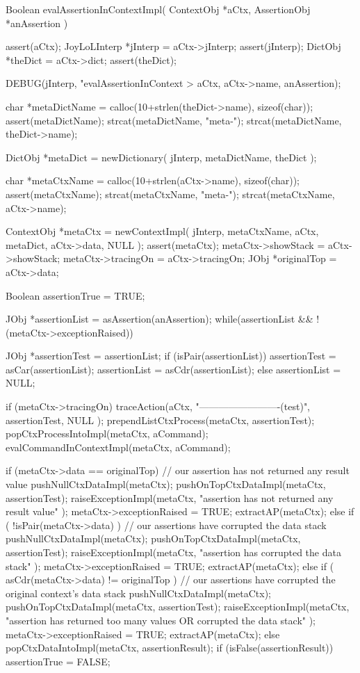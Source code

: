 \startCCode
Boolean evalAssertionInContextImpl(
  ContextObj   *aCtx,
  AssertionObj *anAssertion
) {
  assert(aCtx);
  JoyLoLInterp *jInterp = aCtx->jInterp;
  assert(jInterp);
  DictObj *theDict = aCtx->dict;
  assert(theDict);
  
  DEBUG(jInterp, "evalAssertionInContext > %
    aCtx, aCtx->name, anAssertion);

  char *metaDictName = calloc(10+strlen(theDict->name), sizeof(char));
  assert(metaDictName);
  strcat(metaDictName, "meta-");
  strcat(metaDictName, theDict->name);
  
  DictObj *metaDict = newDictionary(
    jInterp,
    metaDictName,
    theDict
  );
  
  char *metaCtxName = calloc(10+strlen(aCtx->name), sizeof(char));
  assert(metaCtxName);
  strcat(metaCtxName, "meta-");
  strcat(metaCtxName, aCtx->name);
  
  ContextObj *metaCtx = newContextImpl(
    jInterp,
    metaCtxName,
    aCtx,
    metaDict,
    aCtx->data,
    NULL
  );
  assert(metaCtx);
  metaCtx->showStack = aCtx->showStack;
  metaCtx->tracingOn = aCtx->tracingOn;
  JObj *originalTop  = aCtx->data;
  
  Boolean assertionTrue = TRUE;

  JObj *assertionList = asAssertion(anAssertion);
  while(assertionList && !(metaCtx->exceptionRaised)) {
    JObj *assertionTest = assertionList;
    if (isPair(assertionList)) {
      assertionTest = asCar(assertionList);
      assertionList = asCdr(assertionList);
    } else {
      assertionList = NULL;
    }

    if (metaCtx->tracingOn)
      traceAction(aCtx,
        "\n-------------------------\nevalAssertion(test)",
        assertionTest, NULL
      );
    prependListCtxProcess(metaCtx, assertionTest);
    popCtxProcessIntoImpl(metaCtx, aCommand);
    evalCommandInContextImpl(metaCtx, aCommand);
    
    if (metaCtx->data == originalTop) {
      // our assertion has not returned any result value
      pushNullCtxDataImpl(metaCtx);
      pushOnTopCtxDataImpl(metaCtx, assertionTest);
      raiseExceptionImpl(metaCtx,
        "assertion has not returned any result value"
        );
      metaCtx->exceptionRaised = TRUE;
      extractAP(metaCtx);
    } else if ( !isPair(metaCtx->data) ) {
      // our assertions have corrupted the data stack
      pushNullCtxDataImpl(metaCtx);
      pushOnTopCtxDataImpl(metaCtx, assertionTest);
      raiseExceptionImpl(metaCtx,
        "assertion has corrupted the data stack"
        );      
      metaCtx->exceptionRaised = TRUE;
      extractAP(metaCtx);
    } else if ( asCdr(metaCtx->data) != originalTop ) {
      // our assertions have corrupted the original context's data stack
      pushNullCtxDataImpl(metaCtx);
      pushOnTopCtxDataImpl(metaCtx, assertionTest);
      raiseExceptionImpl(metaCtx,
        "assertion has returned too many values OR corrupted the data stack"
        );
      metaCtx->exceptionRaised = TRUE;
      extractAP(metaCtx);
    } else {
      popCtxDataIntoImpl(metaCtx, assertionResult);
      if (isFalse(assertionResult)) {
        assertionTrue = FALSE;
      }
    }
  }
  
}
